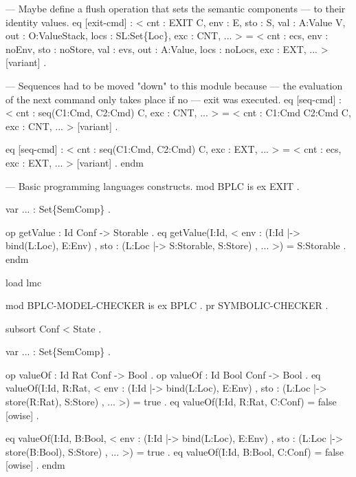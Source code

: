 \documentclass{llncs}%
\begin{document}
    --- Maybe define a flush operation that sets the semantic components
    --- to their identity values.
    eq [exit-cmd] :
        < cnt : EXIT C,
          env : E,
          sto : S,
          val : A:Value V,
          out : O:ValueStack,
          locs : SL:Set\{Loc\},
          exc : CNT, ... > =
        < cnt : ecs,
          env : noEnv,
          sto : noStore,
          val : evs,
          out : A:Value,
          locs : noLocs,
          exc : EXT, ... > [variant] .

    --- Sequences had to be moved "down" to this module because
    --- the evaluation of the next command only takes place if no
    --- exit was executed.
    eq [seq-cmd] :
        < cnt : seq(C1:Cmd, C2:Cmd) C, exc : CNT, ... > =
        < cnt : C1:Cmd C2:Cmd C, exc : CNT, ... > [variant] .

    eq [seq-cmd] :
        < cnt : seq(C1:Cmd, C2:Cmd) C, exc : EXT, ... > =
        < cnt : ecs, exc : EXT, ... > [variant] .
endm
\nwendcode{}\nwdocspar

\nwenddocs{}\endmoddef\nwstartdeflinemarkup\nwenddeflinemarkup
--- Basic programming languages constructs.
mod BPLC is
    ex EXIT .
    
    var ... : Set\{SemComp\} .
    
    op getValue : Id Conf -> Storable .
    eq getValue(I:Id, 
          < env : (I:Id |-> bind(L:Loc), E:Env) ,
          sto : (L:Loc |-> S:Storable, S:Store) ,
          ... >) = S:Storable .
endm
\nwendcode{}\nwdocspar

\nwenddocs{}\endmoddef\nwstartdeflinemarkup\nwenddeflinemarkup
load lmc

mod BPLC-MODEL-CHECKER is
    ex BPLC .
    pr SYMBOLIC-CHECKER .

    subsort Conf < State .
    
    var ... : Set\{SemComp\} .
    
    op valueOf : Id Rat Conf -> Bool .
    op valueOf : Id Bool Conf -> Bool .
    eq valueOf(I:Id, R:Rat,
          < env : (I:Id |-> bind(L:Loc), E:Env) ,
            sto : (L:Loc |-> store(R:Rat), S:Store) ,
            ... >) = true .
    eq valueOf(I:Id, R:Rat, C:Conf) = false [owise] .

    eq valueOf(I:Id, B:Bool,
          < env : (I:Id |-> bind(L:Loc), E:Env) ,
            sto : (L:Loc |-> store(B:Bool), S:Store) ,
            ... >) = true .
    eq valueOf(I:Id, B:Bool, C:Conf) = false [owise] .
endm
\nwendcode{}\nwdocspar
\end{document}
